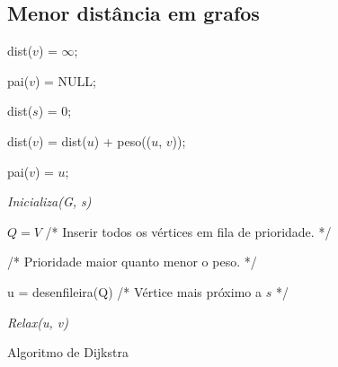 \begin{easylist}
\section{Menor distância em grafos}


\begin{algorithm}[H]
\SetAlgoLined
{}
  {
    {
      dist($v$) = $\infty$;

      pai($v$) = NULL;
    }
    dist($s$) = 0;
  }

  {
    { 
      dist($v$) = dist($u$) + peso(($u$, $v$));

      pai($v$) = $u$;
    }
  }
  
  {
    \textit{Inicializa(G, s)}

    $Q = V$            /* Inserir todos os vértices em fila de prioridade. */
    
    \hspace{1cm}       /* Prioridade maior quanto menor o peso. */

    {
      u = desenfileira(Q) /* Vértice mais próximo a $s$ */

      {
        \textit{Relax(u, v)}
      }
    }
  }
  \caption{Algoritmo de Dijkstra}
\end{algorithm}



\end{easylist}









